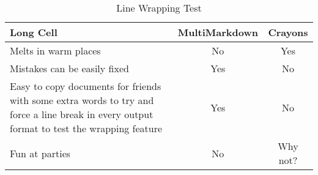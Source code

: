 \begin{table}[htbp]
\begin{minipage}{\linewidth}
\setlength{\tymax}{0.5\linewidth}
\centering
\small
\caption{Line Wrapping Test}
\label{linewrappingtest}
\begin{tabulary}{\textwidth}{@{}LCC@{}} \toprule
Long Cell&MultiMarkdown&Crayons\\
\midrule
Melts in warm places&No&Yes\\
Mistakes can be easily fixed&Yes&No\\
Easy to copy documents for friends with some extra words to try and force a line break in every output format to test the wrapping feature&Yes&No\\
Fun at parties&No&Why not?\\

\bottomrule

\end{tabulary}
\end{minipage}
\end{table}




